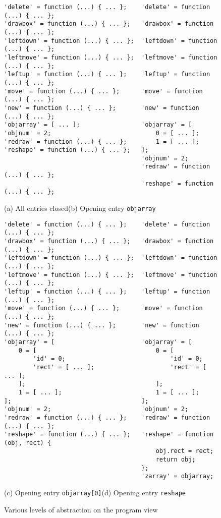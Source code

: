 \begin{figure}[htb]
\begin{verbatim}
'delete' = function (...) { ... };    'delete' = function (...) { ... };
'drawbox' = function (...) { ... };   'drawbox' = function (...) { ... };
'leftdown' = function (...) { ... };  'leftdown' = function (...) { ... };
'leftmove' = function (...) { ... };  'leftmove' = function (...) { ... };
'leftup' = function (...) { ... };    'leftup' = function (...) { ... };
'move' = function (...) { ... };      'move' = function (...) { ... };
'new' = function (...) { ... };       'new' = function (...) { ... };
'objarray' = [ ... ];                 'objarray' = [
'objnum' = 2;                             0 = [ ... ];
'redraw' = function (...) { ... };        1 = [ ... ];
'reshape' = function (...) { ... };   ];
                                      'objnum' = 2;
                                      'redraw' = function (...) { ... };
                                      'reshape' = function (...) { ... };
\end{verbatim}

\hfil(a) All entries closed\hfil\hfil(b) Opening entry {\tt objarray}\hfil

\begin{verbatim}
'delete' = function (...) { ... };    'delete' = function (...) { ... };
'drawbox' = function (...) { ... };   'drawbox' = function (...) { ... };
'leftdown' = function (...) { ... };  'leftdown' = function (...) { ... };
'leftmove' = function (...) { ... };  'leftmove' = function (...) { ... };
'leftup' = function (...) { ... };    'leftup' = function (...) { ... };
'move' = function (...) { ... };      'move' = function (...) { ... };
'new' = function (...) { ... };       'new' = function (...) { ... };
'objarray' = [                        'objarray' = [
    0 = [                                 0 = [
        'id' = 0;                             'id' = 0;
        'rect' = [ ... ];                     'rect' = [ ... ];
    ];                                    ];
    1 = [ ... ];                          1 = [ ... ];
];                                    ];
'objnum' = 2;                         'objnum' = 2;
'redraw' = function (...) { ... };    'redraw' = function (...) { ... };
'reshape' = function (...) { ... };   'reshape' = function (obj, rect) {
                                          obj.rect = rect;
                                          return obj;
                                      };
                                      'zarray' = objarray;
\end{verbatim}

\hfil(c) Opening entry {\tt objarray[0]}\hfil\hfil(d) Opening entry {\tt reshape}\hfil\hfil

\caption{Various levels of abstraction on the program view}
\label{figpviews}
\end{figure}

